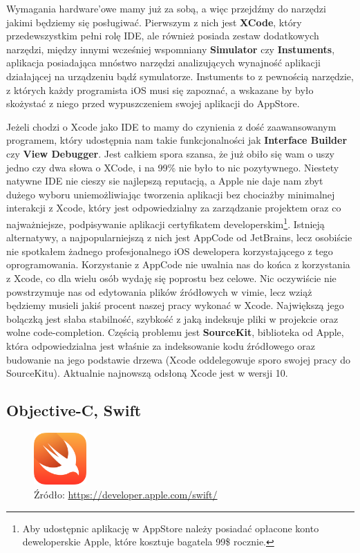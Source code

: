 \documentclass{article}
\begin{document}
Wymagania hardware'owe mamy już za sobą, a więc przejdźmy do narzędzi jakimi będziemy
się posługiwać. Pierwszym z nich jest \textbf{XCode}, który przedewszystkim pełni
rolę IDE, ale również posiada zestaw dodatkowych narzędzi, między innymi wcześniej
wspomniany \textbf{Simulator} czy \textbf{Instuments}, aplikacja posiadająca mnóstwo
narzędzi analizujących wynajność aplikacji działającej na urządzeniu bądź symulatorze.
Instuments to z pewnością narzędzie, z których każdy programista iOS musi się
zapoznać, a wskazane by było skożystać z niego przed wypuszczeniem swojej aplikacji
do AppStore.

Jeżeli chodzi o Xcode jako IDE to mamy do czynienia z dość zaawansowanym programem,
który udostępnia nam takie funkcjonalności jak \textbf{Interface Builder} czy
\textbf{View Debugger}. Jest całkiem spora szansa, że już obiło się wam o uszy
jedno czy dwa słowa o XCode, i na 99\% nie było to nic pozytywnego. Niestety 
natywne IDE nie cieszy sie najlepszą reputacją, a Apple nie daje nam zbyt dużego 
wyboru uniemożliwiając tworzenia aplikacji bez chociażby minimalnej interakcji
z Xcode, który jest odpowiedzialny za zarządzanie projektem oraz co najważniejsze,
podpisywanie aplikacji certyfikatem developerskim\footnote{Aby udostępnic aplikację
w AppStore należy posiadać opłacone konto deweloperskie Apple, które kosztuje 
bagatela 99\$ rocznie.}. Istnieją alternatywy, a najpopularniejszą z nich jest
AppCode od JetBrains, lecz osobiście nie spotkałem żadnego profesjonalnego iOS
dewelopera korzystającego z tego oprogramowania. Korzystanie z AppCode nie
uwalnia nas do końca z korzystania z Xcode, co dla wielu osób wydaję się poprostu
bez celowe. Nic oczywiście nie powstrzymuje nas od edytowania plików źródłowych
w vimie, lecz wziąż będziemy musieli jakiś procent naszej pracy wykonać w Xcode.
Największą jego bolączką jest słaba stabilność, szybkość z jaką indeksuje
pliki w projekcie oraz wolne code-completion. Częścią problemu jest 
\textbf{SourceKit}, biblioteka od Apple, która odpowiedzialna jest właśnie za
indeksowanie kodu źródłowego oraz budowanie na jego podstawie drzewa (Xcode 
oddelegowuje sporo swojej pracy do SourceKitu). Aktualnie najnowszą odsłoną
Xcode jest w wersji 10.

\subsection*{Objective-C, Swift}

\begin{figure}[h]
\centering
\includegraphics[width=2cm]{swift-128_2x}
\caption{Źródło: \url{https://developer.apple.com/swift/}}
\end{figure}
\end{document}
